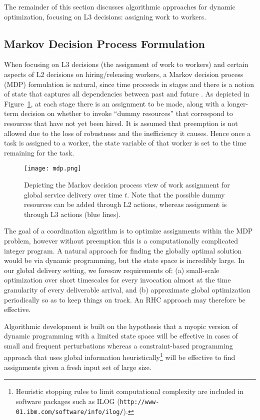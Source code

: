\documentclass[10pt,journal,cspaper,compsoc]{IEEEtran}
\begin{document}
The remainder of this section discusses algorithmic approaches for dynamic optimization,
focusing on L3 decisions: assigning work to workers.

\subsection{Markov Decision Process Formulation}
When focusing on L3 decisions (the assignment of work to workers) and certain aspects of 
L2 decisions on hiring/releasing workers, a Markov decision process (MDP) formulation is natural,
since time proceeds in stages and there is a notion of state that captures all dependencies
between past and future \cite{Howard1960}.  As depicted in Figure~\ref{fig:mdp}, at each stage
there is an assignment to be made, along with a longer-term decision on whether to invoke
``dummy resources'' that correspond to resources that have not yet been hired.  It is assumed
that preemption is not allowed due to the loss of robustness and the inefficiency \cite{OppenheimVC2014}
it causes.  Hence once a task is assigned to a worker, the state variable of that worker is set
to the time remaining for the task.

\begin{figure}
  \centering
  \texttt{[image: mdp.png]}
  \caption{Depicting the Markov decision process view of work assignment for global service delivery over time $t$.  Note that 
	the possible dummy resources can be added through L2 actions, whereas assignment is through L3 actions (blue lines).}
  \label{fig:mdp}
\end{figure}

The goal of a coordination algorithm is to optimize assignments within the MDP problem, however without preemption this
is a computationally complicated integer program.  A natural approach for finding the globally optimal solution would
be via dynamic programming, but the state space is incredibly large.  In our global delivery setting, we foresaw 
requirements of: (a) small-scale optimization over short timescales for every invocation almost at the time granularity 
of every deliverable arrival, and (b) approximate global optimization periodically so as to keep things on track.
An RHC approach may therefore be effective.

Algorithmic development is built on the hypothesis that a myopic version of dynamic programming with a 
limited state space will be effective in cases of small and frequent perturbations whereas a constraint-based programming
approach that uses global information heuristically\footnote{Heuristic stopping rules to limit computational complexity
are included in software packages such as ILOG ({\tt http://www-01.ibm.com/software/info/ilog/}).} will be effective 
to find assignments given a fresh input set of large size.
\end{document}
